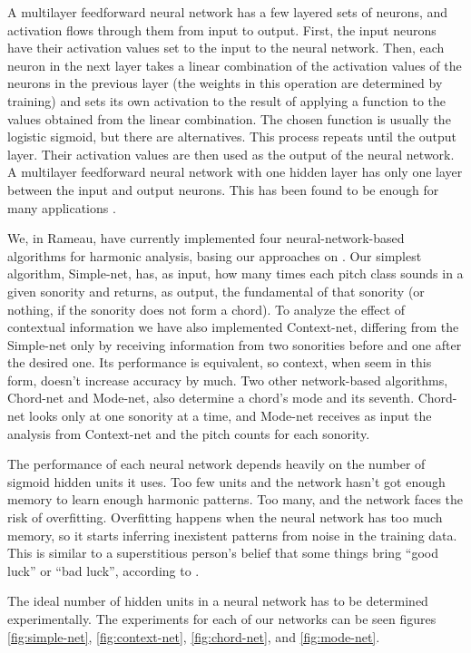 \documentclass{article}
\begin{document}
A multilayer feedforward neural network has a few layered sets of
neurons, and activation flows through them from input to
output. First, the input neurons have their activation values set to
the input to the neural network. Then, each neuron in the next layer
takes a linear combination of the activation values of the neurons in
the previous layer (the weights in this operation are determined by
training) and sets its own activation to the result of applying a
function to the values obtained from the linear combination. The
chosen function is usually the logistic sigmoid, but there are
alternatives. This process repeats until the output layer. Their
activation values are then used as the output of the neural network. A
multilayer feedforward neural network with one hidden layer has only
one layer between the input and output neurons. This has been found to
be enough for many applications
\cite{russell02:aima}.

We, in Rameau, have currently implemented four neural-network-based
algorithms for harmonic analysis, basing our approaches on
\cite{tsui02:_harmon_analy_using_neural_networ}. Our simplest
algorithm, Simple-net, has, as input, how many times each pitch class
sounds in a given sonority and returns, as output, the fundamental of
that sonority (or nothing, if the sonority does not form a chord). To
analyze the effect of contextual information we have also implemented
Context-net, differing from the Simple-net only by receiving
information from two sonorities before and one after the desired
one. Its performance is equivalent, so context, when seem in this
form, doesn't increase accuracy by much. Two other network-based
algorithms, Chord-net and Mode-net, also determine a chord's mode and
its seventh. Chord-net looks only at one sonority at a time, and
Mode-net receives as input the analysis from Context-net and the pitch
counts for each sonority.

The performance of each neural network depends heavily on the number
of sigmoid hidden units it uses. Too few units and the network hasn't
got enough memory to learn enough harmonic patterns. Too many, and the
network faces the risk of overfitting. Overfitting happens when the
neural network has too much memory, so it starts inferring inexistent
patterns from noise in the training data. This is similar to a
superstitious person's belief that some things bring ``good luck'' or
``bad luck'', according to \cite{white95:superstitious}.

The ideal number of hidden units in a neural network has to be
determined experimentally. The experiments for each of our networks
can be seen figures \ref{fig:simple-net}, \ref{fig:context-net},
\ref{fig:chord-net}, and \ref{fig:mode-net}.
\end{document}
